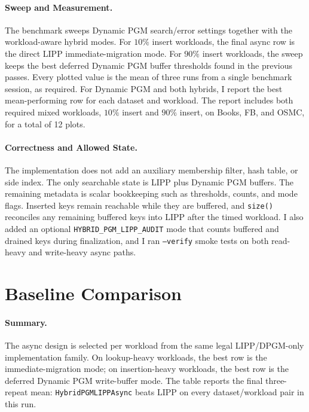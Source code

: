 \documentclass[10pt]{article}
\begin{document}
\paragraph{Sweep and Measurement.}
The benchmark sweeps Dynamic PGM search/error settings together with the workload-aware hybrid modes. For \(10\%\) insert workloads, the final async row is the direct LIPP immediate-migration mode. For \(90\%\) insert workloads, the sweep keeps the best deferred Dynamic PGM buffer thresholds found in the previous passes. Every plotted value is the mean of three runs from a single benchmark session, as required. For Dynamic PGM and both hybrids, I report the best mean-performing row for each dataset and workload. The report includes both required mixed workloads, \(10\%\) insert and \(90\%\) insert, on Books, FB, and OSMC, for a total of 12 plots.

\paragraph{Correctness and Allowed State.}
The implementation does not add an auxiliary membership filter, hash table, or side index. The only searchable state is LIPP plus Dynamic PGM buffers. The remaining metadata is scalar bookkeeping such as thresholds, counts, and mode flags. Inserted keys remain reachable while they are buffered, and \texttt{size()} reconciles any remaining buffered keys into LIPP after the timed workload. I also added an optional \texttt{HYBRID\_PGM\_LIPP\_AUDIT} mode that counts buffered and drained keys during finalization, and I ran \texttt{--verify} smoke tests on both read-heavy and write-heavy async paths.

\section*{Baseline Comparison}



\paragraph{Summary.}
The async design is selected per workload from the same legal LIPP/DPGM-only implementation family. On lookup-heavy workloads, the best row is the immediate-migration mode; on insertion-heavy workloads, the best row is the deferred Dynamic PGM write-buffer mode. The table reports the final three-repeat mean: \texttt{HybridPGMLIPPAsync} beats LIPP on every dataset/workload pair in this run.
\end{document}
